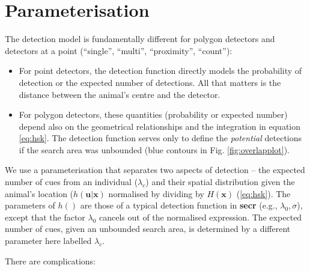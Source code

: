 \documentclass[
]{book}
\providecommand{\tightlist}{%
  \setlength{\itemsep}{0pt}\setlength{\parskip}{0pt}}
\begin{document}
\section{Parameterisation}\label{parameterisation}

The detection model is fundamentally different for polygon detectors and detectors at a point (``single'', ``multi'', ``proximity'', ``count''):

\begin{itemize}
\tightlist
\item
  For point detectors, the detection function directly models the probability of detection or the expected number of detections. All that matters is the distance between the animal's centre and the detector.
\item
  For polygon detectors, these quantities (probability or expected number) depend also on the geometrical relationships and the integration in equation \eqref{eq:hsk}. The detection function serves only to define the \emph{potential} detections if the search area was unbounded (blue contours in Fig. \ref{fig:overlapplot}).
\end{itemize}

We use a parameterisation that separates two aspects of detection -- the expected number of cues from an individual (\(\lambda_c\)) and their spatial distribution given the animal's location (\(h(\mathbf{u}| \mathbf{x})\) normalised by dividing by \(H(\mathbf{x})\) (\eqref{eq:hsk}). The parameters of \(h()\) are those of a typical detection function in \textbf{secr} (e.g., \(\lambda_0, \sigma\)), except that the factor \(\lambda_0\) cancels out of the normalised expression. The expected number of cues, given an unbounded search area, is determined by a different parameter here labelled \(\lambda_c\).

There are complications:
\end{document}
